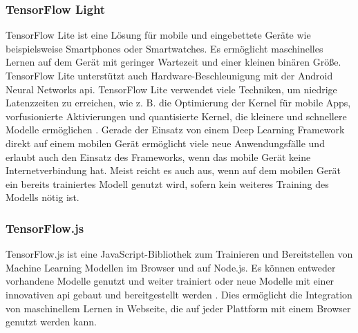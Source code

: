 \subsubsection{TensorFlow Light}
TensorFlow Lite ist eine Lösung für mobile und eingebettete Geräte wie beispielsweise Smartphones oder Smartwatches. Es ermöglicht maschinelles Lernen auf dem Gerät mit geringer Wartezeit und einer kleinen binären Größe. TensorFlow Lite unterstützt auch Hardware-Beschleunigung mit der Android Neural Networks \ac{api}. TensorFlow Lite verwendet viele Techniken, um niedrige Latenzzeiten zu erreichen, wie z. B. die Optimierung der Kernel für mobile Apps, vorfusionierte Aktivierungen und quantisierte Kernel, die kleinere und schnellere Modelle ermöglichen \cite{tensorflow}. Gerade der Einsatz von einem Deep Learning Framework direkt auf einem mobilen Gerät ermöglicht viele neue Anwendungsfälle und erlaubt auch den Einsatz des Frameworks, wenn das mobile Gerät keine Internetverbindung hat. Meist reicht es auch aus, wenn auf dem mobilen Gerät ein bereits trainiertes Modell genutzt wird, sofern kein weiteres Training des Modells nötig ist. 

\subsubsection{TensorFlow.js}
TensorFlow.js ist eine JavaScript-Bibliothek zum Trainieren und Bereitstellen von Machine Learning Modellen im Browser und auf Node.js. Es können entweder vorhandene Modelle genutzt und weiter trainiert oder neue Modelle mit einer innovativen \ac{api} gebaut und bereitgestellt werden \cite{tensorflowjs}. Dies ermöglicht die Integration von maschinellem Lernen in Webseite, die auf jeder Plattform mit einem Browser genutzt werden kann.

